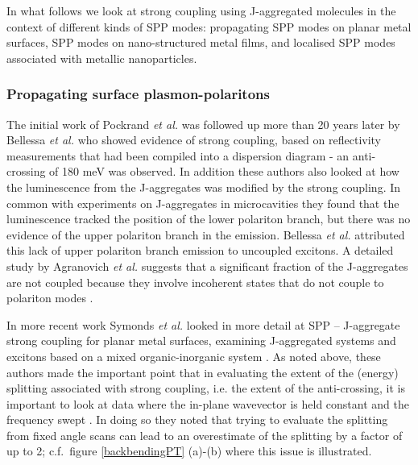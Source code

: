 \documentclass[12pt]{iopart}
\begin{document}
In what follows we look at strong coupling using J-aggregated molecules in the context of different kinds of SPP modes: propagating SPP modes on planar metal surfaces, SPP modes on nano-structured metal films, and localised SPP modes associated with metallic nanoparticles.

\subsubsection{Propagating surface plasmon-polaritons}

The initial work of Pockrand {\it et al.} \cite{Pockrand_JChemPhys_1982_77_6289} was followed up more than 20 years later by Bellessa {\it et al.} \cite{Bellessa2004} who showed evidence of strong coupling, based on reflectivity measurements that had been compiled into a dispersion diagram - an anti-crossing of 180 meV was observed. In addition these authors also looked at how the luminescence from the J-aggregates was modified by the strong coupling. In common with experiments on J-aggregates in microcavities \cite{Lidzey_PRL_1999_82_3316} they found that the luminescence tracked the position of the lower polariton branch, but there was no evidence of the upper polariton branch in the emission. Bellessa {\it et al.} attributed this lack of upper polariton branch emission to uncoupled excitons. A detailed study by Agranovich {\it et al.} suggests that a significant fraction of the J-aggregates are not coupled because they involve incoherent states that do not couple to polariton modes \cite{Agranovich_PRB_2003_67_085311}.

In more recent work Symonds {\it et al.} looked in more detail at SPP -- J-aggregate strong coupling for planar metal surfaces, examining J-aggregated systems \cite{Symonds_NJP_2008_10_065017} and excitons based on a mixed organic-inorganic system \cite{Symonds_NJP_2008_10_065017,Symonds_APL_2007_90_091107}. As noted above, these authors made the important point that in evaluating the extent of the (energy) splitting associated with strong coupling, i.e. the extent of the anti-crossing, it is important to look at data where the in-plane wavevector is held constant and the frequency swept \cite{Symonds_NJP_2008_10_065017}. In doing so they noted that trying to evaluate the splitting from fixed angle scans can lead to an overestimate of the splitting by a factor of up to 2; c.f.\
figure \ref{backbendingPT} (a)-(b) where this issue is illustrated.
\end{document}
